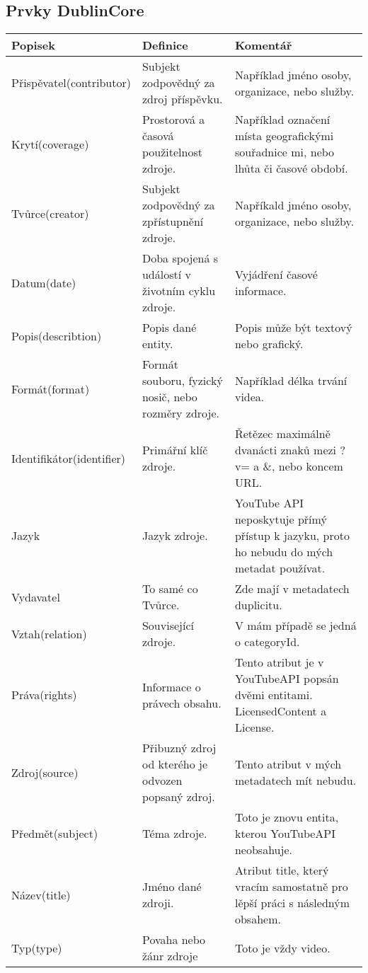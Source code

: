 \subsection{Prvky DublinCore}
\begin{tabular}{| l | l | l |}
\hline
Popisek & Definice & Komentář\\
\hline
Přispěvatel(contributor) & Subjekt zodpovědný za zdroj příspěvku. & Například jméno osoby, organizace, nebo služby.\\
\hline
Krytí(coverage) & Prostorová a časová použitelnost zdroje. & Například označení místa geografickými souřadnice mi, nebo lhůta či časové období.\\
\hline
Tvůrce(creator) & Subjekt zodpovědný za zpřístupnění zdroje. & Napříkald jméno osoby, organizace, nebo služby.\\
\hline
Datum(date) & Doba spojená s událostí v životním cyklu zdroje. & Vyjádření časové informace. \\
\hline
Popis(describtion) & Popis dané entity. & Popis může být textový nebo grafický. \\
\hline
Formát(format) & Formát souboru, fyzický nosič, nebo rozměry zdroje. & Například délka trvání videa. \\
\hline
Identifikátor(identifier) & Primářní klíč zdroje. & Řetězec maximálně dvanácti znaků mezi ?v= a \&, nebo koncem URL.\\
\hline
Jazyk & Jazyk zdroje. & YouTube API neposkytuje přímý přístup k jazyku, proto ho nebudu do mých metadat používat.\\
\hline
Vydavatel & To samé co Tvůrce. & Zde mají v metadatech duplicitu. \\
\hline
Vztah(relation) & Související zdroje. & V mám případě se jedná o categoryId. \\
\hline
Práva(rights) & Informace o právech obsahu. & Tento atribut je v YouTubeAPI popsán dvěmi entitami. LicensedContent a License.\\
\hline
Zdroj(source) & Přibuzný zdroj od kterého je odvozen popsaný zdroj. & Tento atribut v mých metadatech mít nebudu.\\
\hline
Předmět(subject) & Téma zdroje. & Toto je znovu entita, kterou YouTubeAPI neobsahuje.\\
\hline
Název(title) & Jméno dané zdroji. & Atribut title, který vracím samostatně pro lěpší práci s následným obsahem.\\
\hline
Typ(type) & Povaha nebo žánr zdroje & Toto je vždy video.\\
\hline
\end{tabular}
